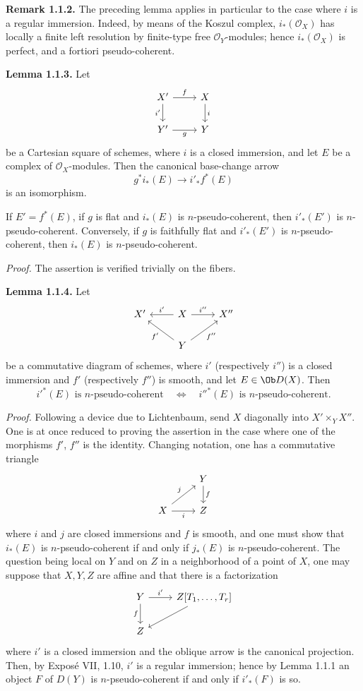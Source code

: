 \documentclass[11pt]{article}
\begin{document}
\textbf{Remark 1.1.2.} The preceding lemma applies in particular to the case where \(i\) is a regular immersion. Indeed, by means of the Koszul complex, \(i_*(\mathcal O_X)\) has locally a finite left resolution by finite-type free \(\mathcal O_Y\)-modules; hence \(i_*(\mathcal O_X)\) is perfect, and a fortiori pseudo-coherent.

\textbf{Lemma 1.1.3.} Let
\[
\begin{tikzcd}
X' \arrow[r,"f"] \arrow[d,"i'"'] & X \arrow[d,"i"]\\
Y' \arrow[r,"g"'] & Y
\end{tikzcd}
\]
be a Cartesian square of schemes, where \(i\) is a closed immersion, and let \(E\) be a complex of \(\mathcal O_X\)-modules. Then the canonical base-change arrow
\[
  g^*i_*(E)\longrightarrow i'_*f^*(E)
\]
is an isomorphism.

If \(E'=f^*(E)\), if \(g\) is flat and \(i_*(E)\) is \(n\)-pseudo-coherent, then \(i'_*(E')\) is \(n\)-pseudo-coherent. Conversely, if \(g\) is faithfully flat and \(i'_*(E')\) is \(n\)-pseudo-coherent, then \(i_*(E)\) is \(n\)-pseudo-coherent.

\emph{Proof.} The assertion is verified trivially on the fibers.

\textbf{Lemma 1.1.4.} Let
\[
\begin{tikzcd}
X' & X \arrow[l,"i'"'] \arrow[r,"i''"] & X''\\
& Y \arrow[ul,"f'"] \arrow[ur,"f''"'] &
\end{tikzcd}
\]
be a commutative diagram of schemes, where \(i'\) (respectively \(i''\)) is a closed immersion and \(f'\) (respectively \(f''\)) is smooth, and let \(E\in \Ob D(X)\). Then
\[
  i'^*(E)\text{ is }n\text{-pseudo-coherent}
  \quad\Longleftrightarrow\quad
  i''^*(E)\text{ is }n\text{-pseudo-coherent}.
\]

\emph{Proof.} Following a device due to Lichtenbaum, send \(X\) diagonally into \(X'\times_YX''\). One is at once reduced to proving the assertion in the case where one of the morphisms \(f'\), \(f''\) is the identity. Changing notation, one has a commutative triangle
\[
\begin{tikzcd}
& Y \arrow[d,"f"]\\
X \arrow[r,"i"'] \arrow[ur,"j"] & Z
\end{tikzcd}
\]
where \(i\) and \(j\) are closed immersions and \(f\) is smooth, and one must show that \(i_*(E)\) is \(n\)-pseudo-coherent if and only if \(j_*(E)\) is \(n\)-pseudo-coherent. The question being local on \(Y\) and on \(Z\) in a neighborhood of a point of \(X\), one may suppose that \(X,Y,Z\) are affine and that there is a factorization
\[
\begin{tikzcd}
Y \arrow[r,"i'"] \arrow[d,"f"'] & Z[T_1,\ldots,T_r]\arrow[dl]\\
Z&
\end{tikzcd}
\]
where \(i'\) is a closed immersion and the oblique arrow is the canonical projection. Then, by Exposé VII, 1.10, \(i'\) is a regular immersion; hence by Lemma 1.1.1 an object \(F\) of \(D(Y)\) is \(n\)-pseudo-coherent if and only if \(i'_*(F)\) is so.
\end{document}
